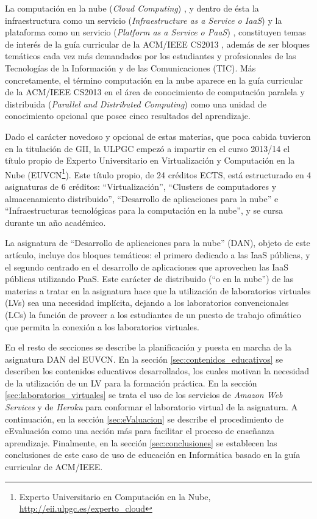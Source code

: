 \documentclass[conference]{IEEEtran}
\begin{document}
La computación en la nube (\textit{Cloud Computing}) \cite{Buyya:2013}, y dentro
de ésta la infraestructura como un servicio (\textit{Infraestructure as a Service o IaaS})
y la plataforma como un servicio (\textit{Platform as a Service o PaaS})
\cite{Carlson:2013},
constituyen temas de interés de la guía curricular de la ACM/IEEE CS2013 \cite{acm:2013},
además de ser bloques temáticos cada vez más demandados por los estudiantes y
profesionales de las Tecnologías de la Información y de las Comunicaciones
(TIC). Más concretamente, el término computación en la nube aparece en la guía curricular de la ACM/IEEE CS2013 
en el área de conocimiento de computación paralela y distribuida (\textit{Parallel and Distributed Computing})
como una unidad de conocimiento opcional que posee cinco resultados del aprendizaje.

Dado el carácter novedoso y opcional de estas materias, que poca cabida tuvieron en la
titulación de GII, la ULPGC empezó a impartir en el curso 2013/14 el título propio de Experto Universitario en
Virtualización y Computación en la Nube (EUVCN\footnote{Experto Universitario en Computación en la Nube,
\url{http://eii.ulpgc.es/experto\_cloud}}). Este título
propio, de 24 créditos ECTS, está estructurado en 4 asignaturas de 6 créditos:
``Virtualización'', ``Clusters de computadores y almacenamiento distribuido'', ``Desarrollo de
aplicaciones para la nube'' e ``Infraestructuras tecnológicas para la
computación en la nube'', y se cursa durante un año académico.

La asignatura de ``Desarrollo de aplicaciones para la nube'' (DAN), objeto de este artículo, incluye dos
bloques temáticos: el primero dedicado a las IaaS públicas, y el segundo centrado en el desarrollo de aplicaciones 
que aprovechen las IaaS públicas utilizando PaaS. Este carácter de distribuido (``o en la nube'') de las
materias a tratar en la asignatura hace que la utilización de laboratorios virtuales (LVs) \cite{Zhang:2010} sea 
una necesidad implícita, dejando a los laboratorios convencionales (LCs) la función de proveer a los estudiantes de un puesto de trabajo
ofimático que permita la conexión a los laboratorios virtuales.


En el resto de secciones se describe la planificación y puesta en marcha de la asignatura
DAN del EUVCN. En  la sección \ref{sec:contenidos_educativos} se describen los
contenidos educativos desarrollados, los cuales motivan la necesidad de la
utilización de un LV para la formación práctica. En la sección
\ref{sec:laboratorios_virtuales} se trata el uso de los servicios de
\textit{Amazon Web Services} \cite{AWS:2011} y de \textit{Heroku}
\cite{Heroku:2013} para conformar el laboratorio virtual de la asignatura. A continuación, en 
la sección \ref{sec:eValuacion} se describe el procedimiento de eEvaluación \cite{Moral2013} como 
una acción más para facilitar el proceso de enseñanza aprendizaje. Finalmente, en la sección
\ref{sec:conclusiones} se establecen las conclusiones de este caso de uso de
educación en Informática basado en la guía curricular de ACM/IEEE.
\end{document}
